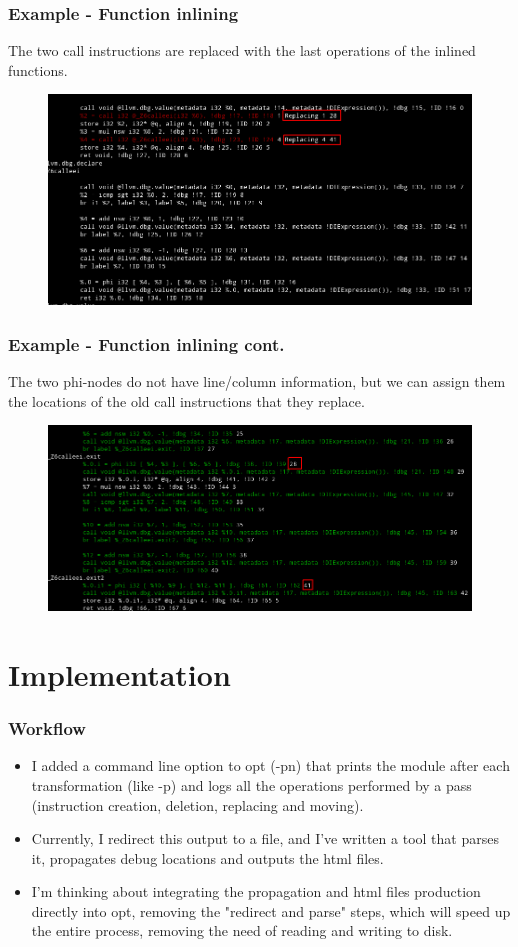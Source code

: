 \documentclass{beamer}
\begin{document}
\begin{frame}
\frametitle{Example - Function inlining}
The two call instructions are replaced with the last operations of the inlined functions.
\begin{figure}[b]
\includegraphics[scale=0.35]{pre_inline.png}
\end{figure}
\end{frame}

\begin{frame}
\frametitle{Example - Function inlining cont.}
The two phi-nodes do not have line/column information, but we can assign them the locations of the old call instructions that they replace.
\begin{figure}[b]
\includegraphics[scale=0.35]{post_inline.png}
\end{figure}
\end{frame}

\section{Implementation}

\begin{frame}
\frametitle{Workflow}
\begin{itemize}
\item I added a command line option to opt (-pn) that prints the module after each transformation (like -p) and logs all the operations performed by a pass (instruction creation, deletion, replacing and moving). 
\item Currently, I redirect this output to a file, and I've written a tool that parses it, propagates debug locations and outputs the html files.
\item I'm thinking about integrating the propagation and html files production directly into opt, removing the "redirect and parse" steps, which will speed up the entire process, removing the need of reading and writing to disk.
\end{itemize}
\end{frame}
\end{document}
